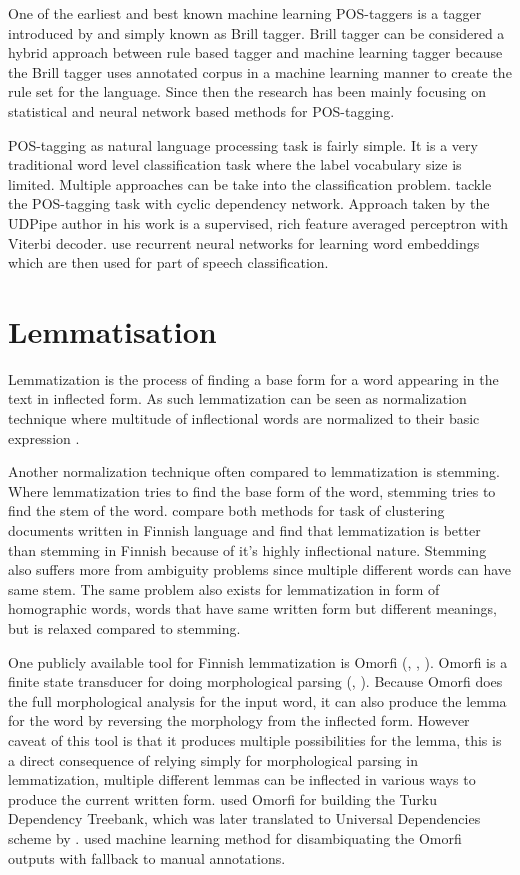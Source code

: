 \documentclass[12pt,a4paper,english
]{tutthesis}
\begin{document}
One of the earliest and best known machine learning POS-taggers is a tagger introduced by \cite{Brill1992} and simply known as Brill tagger. Brill tagger can be considered a hybrid approach between rule based tagger and machine learning tagger because the Brill tagger uses annotated corpus in a machine learning manner to create the rule set for the language. Since then the research has been mainly focusing on statistical and neural network based methods for POS-tagging.

POS-tagging as natural language processing task is fairly simple. It is a very traditional word level classification task where the label vocabulary size is limited. Multiple approaches can be take into the classification problem. \cite{Toutanova2003} tackle the POS-tagging task with cyclic dependency network. Approach taken by the UDPipe author \cite{Straka2016} in his work is a supervised, rich feature averaged perceptron with Viterbi decoder. \cite{Ling2015} use recurrent neural networks for learning word embeddings which are then used for part of speech classification.

\section{Lemmatisation}
\label{se:lemmatisation}
Lemmatization is the process of finding a base form for a word appearing in the text in inflected form. As such lemmatization can be seen as normalization technique where multitude of inflectional words are normalized to their basic expression \cite{Korenius2004}.

Another normalization technique often compared to lemmatization is stemming. Where lemmatization tries to find the base form of the word, stemming tries to find the stem of the word. \cite{Korenius2004} compare both methods for task of clustering documents written in Finnish language and find that lemmatization is better than stemming in Finnish because of it's highly inflectional nature. Stemming also suffers more from ambiguity problems since multiple different words can have same stem. The same problem also exists for lemmatization in form of homographic words, words that have same written form but different meanings, but is relaxed compared to stemming.

One publicly available tool for Finnish lemmatization is Omorfi (\cite{Pirinen2008}, \cite{Linden2009}, \cite{omorfi}). Omorfi is a finite state transducer for doing morphological parsing (\cite{Pirinen2008}, \cite{Linden2009}). Because Omorfi does the full morphological analysis for the input word, it can also produce the lemma for the word by reversing the morphology from the inflected form. However caveat of this tool is that it produces multiple possibilities for the lemma, this is a direct consequence of relying simply for morphological parsing in lemmatization, multiple different lemmas can be inflected in various ways to produce the current written form. \cite{Haverinen2014} used Omorfi for building the Turku Dependency Treebank, which was later translated to Universal Dependencies scheme by \cite{Pyysalo2015}. \cite{Haverinen2014} used machine learning method for disambiquating the Omorfi outputs with fallback to manual annotations.
\end{document}
